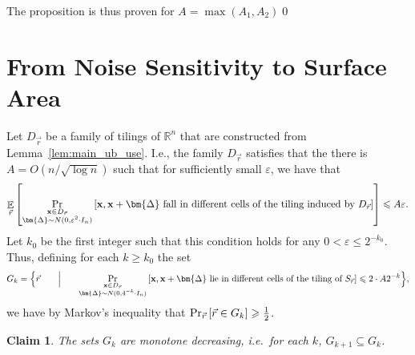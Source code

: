 \documentclass[10pt,a4paper]{article}
\newtheorem{claim}[thm]{Claim}
\newcommand\Prob[2]{{\Pr_{#1}\left[ {#2} \right]}}
\newcommand\Expect[2]{{\mathop{\mathbb{E}}_{#1}\left[ {#2} \right]}}
\newcommand\half{{1\over2}}
\newcommand\eps{\varepsilon}
\renewcommand\geq{\geqslant}
\renewcommand\leq{\leqslant}
\newcommand{\De}{\Delta}
\begin{document}
    The proposition is thus proven for $A = \max(A_1,A_2)$\qed

    \section{From Noise Sensitivity to Surface Area}\label{sec:ns_sa_reduce}
    Let $D_{\vec{r}}$ be a family of tilings of $\mathbb{R}^n$ that are constructed from Lemma~\ref{lem:main_ub_use}.
    I.e., the family $D_{\vec{r}}$ satisfies that the there is $A = O(n/\sqrt{\log n})$ such that for sufficiently small $\eps$, we have that
    \[
      \Expect{\vec{r}}{\Prob{\substack{{\bf x}\in D_{\vec{r}}\\ \bm{\De}\sim N(0,\eps^2\cdot I_n)}}
      {{\bf x},{\bf x}+\bm{\De}\text{ fall in different cells of the tiling induced by }D_{\vec{r}}}}\leq A\eps.
    \]
    Let $k_0$ be the first integer such that this condition holds for any $0 < \eps\leq 2^{-k_0}$.
    Thus, defining for each $k\geq k_0$ the set
    \[
    G_k = \Big\{\vec{r} \qquad\Big|\qquad \Prob{\substack{{\bf x}\in D_{\vec{r}}\\ \bm{\De}\sim N(0,4^{-k}\cdot I_n)}}
    {{\bf x},{\bf x}+\bm{\De}\text{ lie in different cells of the tiling of }S_{\vec{r}}}\leq 2\cdot A 2^{-k}\Big\},
    \]
    we have by Markov's inequality that $\Prob{\vec{r}}{\vec{r}\in G_k}\geq \half$.
    \begin{claim}
      The sets $G_k$ are monotone decreasing, i.e.\ for each $k$, $G_{k+1}\subseteq G_k$.
    \end{claim}
\end{document}
